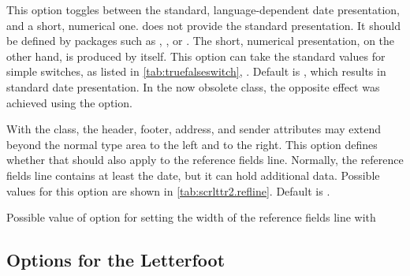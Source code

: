 \begin{Declaration}
\end{Declaration}
%
This option toggles between the standard, language-dependent date
presentation, and a short, numerical one. {\KOMAScript} does not
provide the standard presentation. It should be defined by packages
such as ,
, or
. The short, numerical
presentation, on the other hand, is produced by 
itself. This option can take the standard values for simple switches,
as listed in \autoref{tab:truefalseswitch},
. Default is
, which results in standard date presentation. In the
now obsolete  class, the opposite effect was achieved
using the  option.
%
%

\begin{Declaration}
\end{Declaration}
%
With the  class, the header, footer, address, and
sender attributes may extend beyond the normal type area to the left
and to the right. This option defines whether that should also apply
to the reference fields line. Normally, the reference fields line
contains at least the date, but it can hold additional data. Possible
values for this option are shown in
\autoref{tab:scrlttr2.refline}. Default is .

\begin{table}
  \caption[{Possible value of option  with
    }]{Possible value of option  for setting
    the width of the reference fields line with
    }
  \label{tab:scrlttr2.refline}
  \begin{desctabular}
  \end{desctabular}
\end{table}
%
%

%
%

\subsection{Options for the Letterfoot}
\label{sec:scrlttr2.footoptions}

